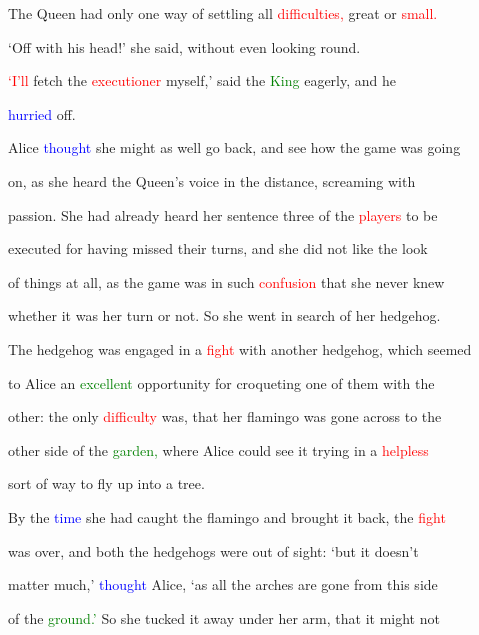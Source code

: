  The Queen had only one way of settling all \textcolor{red}{difficulties,} great or \textcolor{red}{small.}

 ‘Off with his head!’ she said, without even looking round.



 \textcolor{red}{‘I’ll} fetch the \textcolor{red}{executioner} myself,’ said the \textcolor{green}{King} eagerly, and he

 \textcolor{blue}{hurried} off.



 Alice \textcolor{blue}{thought} she might as well go back, and see how the game was going

 on, as she heard the Queen’s voice in the distance, \textcolor{BurntOrange}{screaming} with

 \textcolor{BurntOrange}{passion.} She had already heard her \textcolor{BurntOrange}{sentence} three of the \textcolor{red}{players} to be

 executed for having missed their turns, and she did not like the look

 of things at all, as the game was in such \textcolor{red}{confusion} that she never knew

 whether it was her turn or not. So she went in search of her hedgehog.



 The hedgehog was engaged in a \textcolor{red}{fight} with another hedgehog, which seemed

 to Alice an \textcolor{green}{excellent} \textcolor{BurntOrange}{opportunity} for croqueting one of them with the

 other: the only \textcolor{red}{difficulty} was, that her flamingo was gone across to the

 other side of the \textcolor{green}{garden,} where Alice could see it trying in a \textcolor{red}{helpless}

 sort of way to fly up into a \textcolor{BurntOrange}{tree.}



 By the \textcolor{blue}{time} she had caught the flamingo and brought it back, the \textcolor{red}{fight}

 was over, and both the hedgehogs were out of sight: ‘but it doesn’t

 matter much,’ \textcolor{blue}{thought} Alice, ‘as all the arches are gone from this side

 of the \textcolor{green}{ground.’} So she tucked it away under her arm, that it might not

